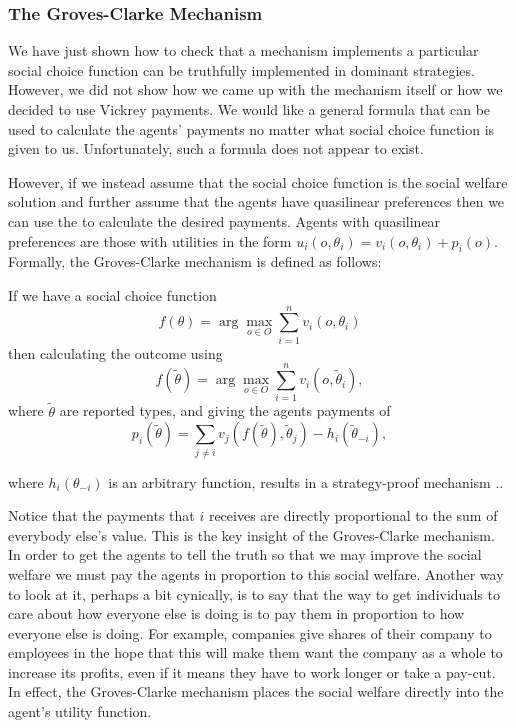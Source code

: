 \subsubsection{The Groves-Clarke Mechanism}

We have just shown how to check
that a mechanism implements a particular social choice function can be
truthfully implemented in dominant strategies. However, we did not
show how we came up with the mechanism itself or how we decided to use
Vickrey payments. We would like a general formula that can be used to
calculate the agents' payments no matter what social choice function
is given to us. Unfortunately, such a formula does not appear to
exist.

However, if we instead assume that the social choice function is the
social welfare solution and further assume that the agents have
quasilinear preferences then we can use the  to calculate the desired payments. Agents with
quasilinear preferences are those with utilities in the form
$u_i(o,\theta_i) = v_i(o,\theta_i) + p_i(o)$. Formally, the
Groves-Clarke mechanism is defined as follows:

\begin{theorem}
  \label{groves}
  If we have a social choice function
  \[
  f(\theta) = \arg \max_{o \in O} \sum_{i=1}^n v_i(o,\theta_i)
  \]
  then calculating the outcome using 
  \[
  f(\tilde{\theta}) = \arg \max_{o \in O} \sum_{i=1}^n v_i(o, \tilde{\theta}_i),
  \]
  where $\tilde{\theta}$ are reported types, and giving the agents payments of 
  \begin{equation}
    \label{eq:gc-payments}
  p_i(\tilde{\theta}) = \sum_{j \neq i} v_j(f(\tilde{\theta}), \tilde{\theta}_j) - h_i(\tilde{\theta}_{-i}),
  \end{equation}


  where $h_i(\theta_{-i})$ is an arbitrary function, results in a
  strategy-proof mechanism \cite{groves73a,clarke71a}..
\end{theorem}

 Notice that the
payments that $i$ receives are directly proportional to the sum of
everybody else's value. This is the key insight of the Groves-Clarke
mechanism. In order to get the agents to tell the truth so that we may
improve the social welfare we must pay the agents in proportion to
this social welfare. Another way to look at it, perhaps a bit
cynically, is to say that the way to get individuals to care about how
everyone else is doing is to pay them in proportion to how everyone
else is doing. For example, companies give shares of their company to
employees in the hope that this will make them want the company as a
whole to increase its profits, even if it means they have to work
longer or take a pay-cut. In effect, the Groves-Clarke mechanism
places the social welfare directly into the agent's utility function.

